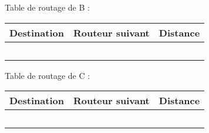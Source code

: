 \documentclass[11pt,a4paper,french,twoside]{PMCours}
\begin{document}
\begin{multicols}{2}

Table de routage de B : 

\begin{tabular}{|c|c|c|}
\hline
Destination&Routeur suivant&Distance\\\hline
&&\\ \hline
&&\\ \hline
&& \\ \hline
&&\\ \hline
&& \\ \hline
\end{tabular}

Table de routage de C :  

\medskip
\begin{tabular}{|c|c|c|}
\hline
Destination&Routeur suivant&Distance\\ \hline
&&\\ \hline
&&\\ \hline
&& \\ \hline
&&\\ \hline
&& \\ \hline
\end{tabular}
\end{multicols}
\end{document}
